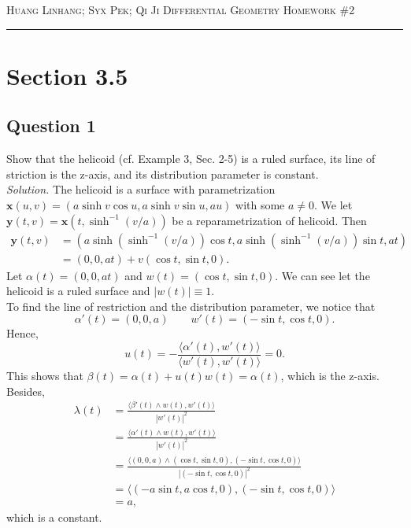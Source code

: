 \documentclass[12pt]{article}
\begin{document}
\thispagestyle{empty}

{\scshape Huang Linhang; Syx Pek; Qi Ji} \hfill {\scshape \large Differential Geometry} \hfill {\scshape Homework \#2}
 
\smallskip
\hrule
\bigskip
\section{Section 3.5}
\subsection*{Question 1}
Show that the helicoid (cf. Example 3, Sec. 2-5) is a ruled surface, its line of striction is the z-axis, and its distribution parameter is constant.\\

\textit{Solution.} The helicoid is a surface with parametrization $\mathbf{x}(u,v) = (a\sinh{v}\cos{u},a\sinh{v}\sin{u},au)$ with some $a \neq 0 $. We let $\mathbf{y}(t,v) = \mathbf{x}(t,\sinh^{-1}(v/a))$ be a reparametrization of helicoid. Then \begin{align*}
    \mathbf{y}(t,v) &= (a\sinh(\sinh^{-1}(v/a))\cos{t},a\sinh(\sinh^{-1}(v/a))\sin{t},at)\\
    &=(0,0,at) + v(\cos{t},\sin{t},0).
\end{align*}
Let $\alpha(t) = (0,0,at)$ and $w(t) = (\cos{t},\sin{t},0)$. We can see let the helicoid is a ruled surface and $|w(t)| \equiv 1$.\\

To find the line of restriction and the distribution parameter, we notice that \begin{equation*}
    \alpha'(t) = (0,0,a)\qquad w'(t) = (-\sin{t},\cos{t},0).
\end{equation*}
Hence, \begin{equation*}
    u(t) =- \frac{\langle \alpha'(t), w'(t)\rangle}{\langle w'(t), w'(t)\rangle}=0.
\end{equation*}
This shows that $\beta(t) = \alpha(t) + u(t)w(t) = \alpha(t)$, which is the z-axis. Besides, \begin{align*}
    \lambda(t) &= \frac{\langle\beta'(t)\wedge w(t),w'(t)\rangle}{|w'(t)|^2}\\
    &=\frac{\langle\alpha'(t)\wedge w(t),w'(t)\rangle}{|w'(t)|^2}\\
    &=\frac{\langle(0,0,a)\wedge (\cos{t},\sin{t},0),(-\sin{t},\cos{t},0)\rangle}{|(-\sin{t},\cos{t},0)|^2}\\
    &=\langle (-a\sin{t},a\cos{t},0),(-\sin{t},\cos{t},0)\rangle\\
    &=a,
\end{align*}
which is a constant.
 
\end{document}
